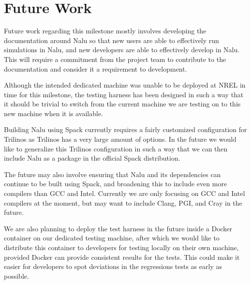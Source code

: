 \documentclass[12pt, oneside]{article}
\begin{document}
\section{Future Work}

Future work regarding this milestone mostly involves developing the documentation around Nalu so that new users are able to effectively run simulations in Nalu, and new developers are able to effectively develop in Nalu. This will require a commitment from the project team to contribute to the documentation and consider it a requirement to development.

Although the intended dedicated machine was unable to be deployed at NREL in time for this milestone, the testing harness has been designed in such a way that it should be trivial to switch from the current machine we are testing on to this new machine when it is available.

Building Nalu using Spack currently requires a fairly customized configuration for Trilinos as Trilinos has a very large amount of options. In the future we would like to generalize this Trilinos configuration in such a way that we can then include Nalu as a package in the official Spack distribution.

The future may also involve ensuring that Nalu and its dependencies can continue to be built using Spack, and broadening this to include even more compilers than GCC and Intel. Currently we are only focusing on GCC and Intel compilers at the moment, but may want to include Clang, PGI, and Cray in the future.

We are also planning to deploy the test harness in the future inside a Docker container on our dedicated testing machine, after which we would like to distribute this container to developers for testing locally on their own machine, provided Docker can provide consistent results for the tests. This could make it easier for developers to spot deviations in the regressions tests as early as possible.
\end{document}

